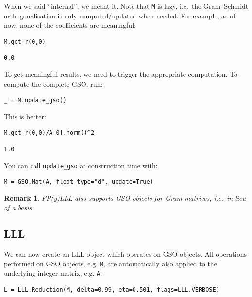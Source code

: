 \documentclass[10pt,a4paper,nobib]{tufte-handout}
\newtheorem{remark}{Remark}
\begin{document}
When we said “internal”, we meant it. Note that \texttt{M} is lazy, i.e. the Gram--Schmidt orthogonalisation is only computed/updated when needed. For example, as of now, none of the coefficients are meaningful:
\lstset{language=Python,label= ,caption= ,captionpos=b,numbers=none}
\begin{lstlisting}
M.get_r(0,0)
\end{lstlisting}

\begin{verbatim}
0.0
\end{verbatim}


To get meaningful results, we need to trigger the appropriate computation. To compute the complete GSO, run:

\lstset{language=Python,label= ,caption= ,captionpos=b,numbers=none}
\begin{lstlisting}
_ = M.update_gso()
\end{lstlisting}

This is better:
\lstset{language=Python,label= ,caption= ,captionpos=b,numbers=none}
\begin{lstlisting}
M.get_r(0,0)/A[0].norm()^2  
\end{lstlisting}

\begin{verbatim}
1.0
\end{verbatim}


You can call \texttt{update\_gso} at construction time with:
\lstset{language=Python,label= ,caption= ,captionpos=b,numbers=none}
\begin{lstlisting}
M = GSO.Mat(A, float_type="d", update=True)
\end{lstlisting}

\begin{remark}
FP(y)LLL also supports GSO objects for Gram matrices, i.e. in lieu of a basis.
\end{remark}

\subsection{LLL}
\label{sec:org64152f7}

We can now create an LLL object which operates on GSO objects. All operations performed on GSO objects, e.g. \texttt{M}, are automatically also applied to the underlying integer matrix, e.g. \texttt{A}.
\lstset{language=Python,label= ,caption= ,captionpos=b,numbers=none}
\begin{lstlisting}
L = LLL.Reduction(M, delta=0.99, eta=0.501, flags=LLL.VERBOSE)
\end{lstlisting}
\end{document}
